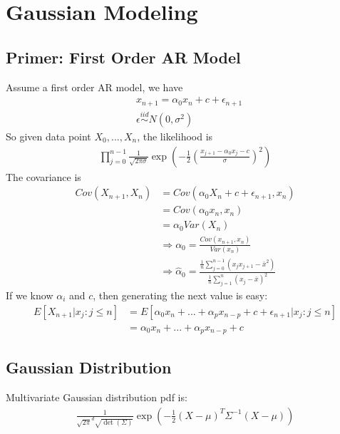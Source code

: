 \chapter{Gaussian Modeling}

\section{Primer: First Order AR Model} 
Assume a first order AR model, we have 
    \begin{align*}
        & x_{n+1} = \alpha_0 x_n + c + \epsilon_{n+1}\\
        & \epsilon \overset{iid}{\sim} N(0, \sigma^2)
    \end{align*}
So given data point $X_0, ..., X_n$, the likelihood is 
    \begin{align*}
        \prod_{j=0}^{n-1} \frac{1}{\sqrt{2\pi \sigma}} \exp\left(-\frac{1}{2} \left(\frac{x_{j+1} - \alpha_0 x_j - c}{\sigma} \right)^2 \right)
    \end{align*}
The covariance is 
    \begin{align*}
        Cov(X_{n+1}, X_n) 
        & = Cov(\alpha_0 X_n + c + \epsilon_{n+1}, x_n) \\
        & = Cov(\alpha_0 x_n , x_n) \\
        & = \alpha_0 Var(X_n)\\
        & \Longrightarrow \alpha_0 = \frac{Cov(x_{n+1}, x_n)}{Var(x_n)}\\
        & \Longrightarrow \hat{\alpha}_0 = \frac{\frac{1}{n} \sum_{j=0}^{n-1}(x_j x_{j+1} - \bar{x}^2)}{\frac{1}{n} \sum_{j=1}^n(x_j - \bar{x})^2}
    \end{align*}
If we know $\alpha_i$ and $c$, then generating the next value is easy: 
    \begin{align*}
        E[X_{n+1}|x_j: j \leq n ] 
        & = E[\alpha_0 x_n + ... + \alpha_p x_{n-p} + c + \epsilon_{n+1} | x_j : j \leq n]\\
        & = \alpha_0 x_n + ... + \alpha_p x_{n-p} + c
    \end{align*}

\section{Gaussian Distribution} 
Multivariate Gaussian distribution pdf is: 
    \begin{align*}
        \frac{1}{\sqrt{2\pi}^d \sqrt{\det(\Sigma)}} \exp\left(-\frac{1}{2}(X-\mu)^T\Sigma^{-1}(X-\mu)\right)
    \end{align*}

